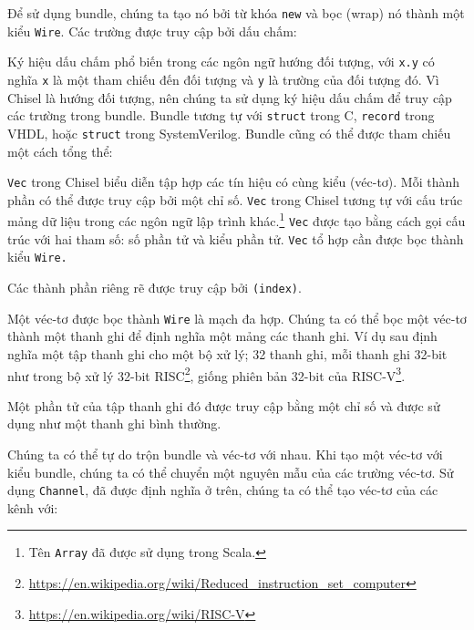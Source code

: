 \documentclass[%
    10pt,
    headinclude, footexclude,
    openright, %
    notitlepage,
    cleardoubleempty,
    headsepline,
    pointlessnumbers,
    bibtotoc, idxtotoc,
    ]{scrbook}
\newcommand{\code}[1]{{\small{\texttt{#1}}}}
\newcommand{\codefoot}[1]{{\footnotesize{\texttt{#1}}}}
\newcommand{\myref}[2]{\href{#1}{#2}}
\renewcommand{\myref}[2]{{#2}{\footnote{\url{#1}}}}
\begin{document}

\noindent Để sử dụng bundle, chúng ta tạo nó bởi từ khóa \code{new} và bọc (wrap) nó thành một kiểu \code{Wire}.
Các trường được truy cập bởi dấu chấm:


Ký hiệu dấu chấm phổ biến trong các ngôn ngữ hướng đối tượng, với \code{x.y} có nghĩa
\code{x} là một tham chiếu đến đối tượng và \code{y} là trường của đối tượng đó.
Vì Chisel là hướng đối tượng, nên chúng ta sử dụng ký hiệu dấu chấm để truy cập các trường trong bundle.
Bundle tương tự với \code{struct} trong C, \code{record} trong VHDL, hoặc
\code{struct} trong SystemVerilog.
Bundle cũng có thể được tham chiếu một cách tổng thể:


\code{Vec} trong Chisel biểu diễn tập hợp các tín hiệu có cùng kiểu (véc-tơ).
Mỗi thành phần có thể được truy cập bởi một chỉ số. \code{Vec} trong Chisel tương tự với 
cấu trúc mảng dữ liệu trong các ngôn ngữ lập trình khác.\footnote{Tên \codefoot{Array}
đã được sử dụng trong Scala.}
\code{Vec} được tạo bằng cách gọi cấu trúc với hai tham số: số phần tử và kiểu phần tử. 
\code{Vec} tổ hợp cần được bọc thành kiểu \code{Wire.}


\noindent Các thành phần riêng rẽ được truy cập bởi \code{(index)}.


Một véc-tơ được bọc thành \code{Wire} là mạch đa hợp.
Chúng ta có thể bọc một véc-tơ thành một thanh ghi để định nghĩa một mảng các thanh ghi.
Ví dụ sau định nghĩa một tập thanh ghi cho một bộ xử lý; 32 thanh ghi, mỗi thanh ghi 32-bit
như trong bộ xử lý 32-bit \myref{https://en.wikipedia.org/wiki/Reduced_instruction_set_computer}{RISC}, giống 
phiên bản 32-bit của \myref{https://en.wikipedia.org/wiki/RISC-V}{RISC-V}.


\noindent Một phần tử của tập thanh ghi đó được truy cập bằng một chỉ số và được sử dụng như một thanh ghi bình thường.


Chúng ta có thể tự do trộn bundle và véc-tơ với nhau. Khi tạo một véc-tơ với kiểu 
bundle, chúng ta có thể chuyển một nguyên mẫu của các trường véc-tơ. Sử dụng 
\code{Channel}, đã được định nghĩa ở trên, chúng ta có thể tạo véc-tơ của các kênh với:
\end{document}
